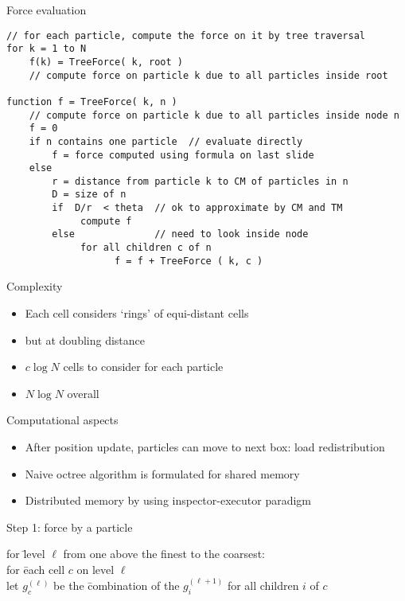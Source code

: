 \begin{frame}[fragile]{Force evaluation}
\verbatimsize
\begin{verbatim}
// for each particle, compute the force on it by tree traversal
for k = 1 to N
    f(k) = TreeForce( k, root )   
    // compute force on particle k due to all particles inside root

function f = TreeForce( k, n )   
    // compute force on particle k due to all particles inside node n
    f = 0
    if n contains one particle  // evaluate directly
        f = force computed using formula on last slide
    else
        r = distance from particle k to CM of particles in n
        D = size of n
        if  D/r  < theta  // ok to approximate by CM and TM
             compute f 
        else              // need to look inside node
             for all children c of n
                   f = f + TreeForce ( k, c )
\end{verbatim}
\end{frame}

\begin{frame}{Complexity}
  \begin{itemize}
  \item Each cell considers `rings' of equi-distant cells
  \item but at doubling distance
  \item $c\log N$ cells to consider for each particle
  \item $N\log N$ overall
  \end{itemize}  
\end{frame}

\begin{frame}{Computational aspects}
  \begin{itemize}
  \item After position update, particles can move to next box: load redistribution
  \item Naive octree algorithm is formulated for shared memory
  \item Distributed memory by using inspector-executor paradigm
  \end{itemize}
\end{frame}

\begin{frame}{Step 1: force by a particle}
  \begin{tabbing}
    for \=level $\ell$ from one above the finest to the coarsest:\\
    \>for \=each cell $c$ on level $\ell$\\
    \>\>let $g^{(\ell)}_c$ be the \=combination of the $g^{(\ell+1)}_i$
    for all children $i$ of $c$
  \end{tabbing}
\end{frame}

